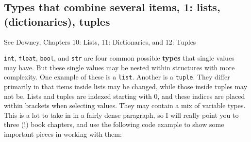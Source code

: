 \documentclass[a4paper,10pt]{scrartcl}
\begin{document}
\subsection{Types that combine several items, 1: lists, (dictionaries), tuples}
\label{s:containerTypes}

\begin{framed}
See Downey, Chapters 10: Lists, 11: Dictionaries, and 12: Tuples
\end{framed}

\lstinline{int}, \lstinline{float}, \lstinline{bool}, and \lstinline{str} are four common possible \textbf{types} that single values may have. But these single values may be nested within structures with more complexity. One example of these is a \lstinline{list}. Another is a \lstinline{tuple}. They differ primarily in that items inside lists may be changed, while those inside tuples may not be. Lists and tuples are indexed starting with 0, and these indices are placed within brackets when selecting values. They may contain a mix of variable types. This is a lot to take in in a fairly dense paragraph, so I will really point you to three (!) book chapters, and use the following code example to show some important pieces in working with them:
\end{document}
